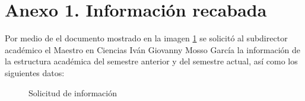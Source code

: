 \label{sec:Anexos}

\section{Anexo 1. Información recabada}

Por medio de el documento mostrado en la imagen \ref{fig:info} se solicitó al subdirector académico el Maestro en Ciencias Iván Giovanny Mosso García la información de la estructura académica del semestre anterior y del semestre actual, así como los siguientes datos:


 \begin{figure}[htbp!]
 	\begin{center}
 		\caption{Solicitud de información}
 		\label{fig:info}
 	\end{center}
 \end{figure}

